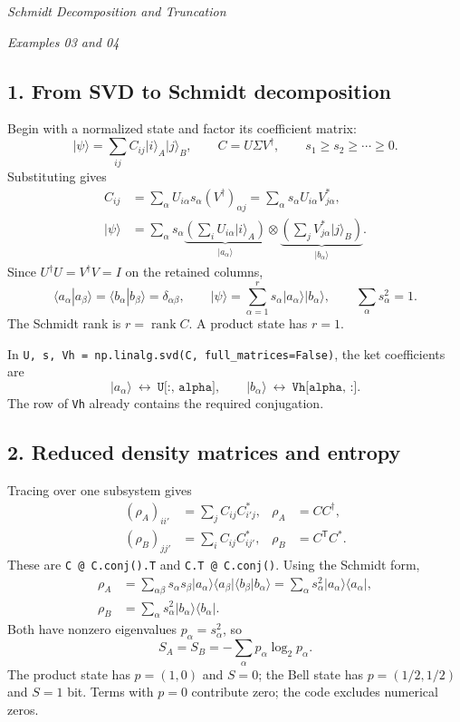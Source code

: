 \documentclass[11pt]{article}
\newcommand{\ket}[1]{\lvert #1\rangle}
\newcommand{\bra}[1]{\langle #1\rvert}
\newcommand{\heading}[1]{\begin{center}\large\textit{#1}\end{center}}
\begin{document}
\heading{Schmidt Decomposition and Truncation}
\textit{Examples 03 and 04}

\subsection*{1. From SVD to Schmidt decomposition}
Begin with a normalized state and factor its coefficient matrix:
\begin{equation}
\ket{\psi}=\sum_{ij}C_{ij}\ket{i}_A\ket{j}_B,
\qquad C=U\Sigma V^\dagger,\qquad s_1\geq s_2\geq\cdots\geq0.
\end{equation}
Substituting gives
\begin{align}
C_{ij}&=\sum_\alpha U_{i\alpha}s_\alpha(V^\dagger)_{\alpha j}
=\sum_\alpha s_\alpha U_{i\alpha}V_{j\alpha}^*,\\
\ket{\psi}&=\sum_\alpha s_\alpha
\underbrace{\left(\sum_i U_{i\alpha}\ket{i}_A\right)}_{\ket{a_\alpha}}
\otimes\underbrace{\left(\sum_j V_{j\alpha}^*\ket{j}_B\right)}_{\ket{b_\alpha}}.
\end{align}
Since $U^\dagger U=V^\dagger V=I$ on the retained columns,
\begin{equation}
\langle a_\alpha|a_\beta\rangle
=\langle b_\alpha|b_\beta\rangle=\delta_{\alpha\beta},
\qquad \ket{\psi}=\sum_{\alpha=1}^r s_\alpha\ket{a_\alpha}\ket{b_\alpha},
\qquad\sum_\alpha s_\alpha^2=1.
\end{equation}
The Schmidt rank is $r=\operatorname{rank}C$. A product state has $r=1$.

In \texttt{U, s, Vh = np.linalg.svd(C, full\_matrices=False)}, the ket coefficients are
\begin{equation}
\ket{a_\alpha}\ \longleftrightarrow\ \texttt{U[:, alpha]},
\qquad \ket{b_\alpha}\ \longleftrightarrow\ \texttt{Vh[alpha, :]}.
\end{equation}
The row of \texttt{Vh} already contains the required conjugation.

\subsection*{2. Reduced density matrices and entropy}
Tracing over one subsystem gives
\begin{align}
(\rho_A)_{ii'}&=\sum_j C_{ij}C^*_{i'j},&\rho_A&=CC^\dagger,\\
(\rho_B)_{jj'}&=\sum_i C_{ij}C^*_{ij'},&\rho_B&=C^{\mathsf T}C^*.
\end{align}
These are \texttt{C @ C.conj().T} and \texttt{C.T @ C.conj()}. Using the Schmidt form,
\begin{align}
\rho_A&=\sum_{\alpha\beta}s_\alpha s_\beta\ket{a_\alpha}\bra{a_\beta}
\langle b_\beta|b_\alpha\rangle
=\sum_\alpha s_\alpha^2\ket{a_\alpha}\bra{a_\alpha},\\
\rho_B&=\sum_\alpha s_\alpha^2\ket{b_\alpha}\bra{b_\alpha}.
\end{align}
Both have nonzero eigenvalues $p_\alpha=s_\alpha^2$, so
\begin{equation}
S_A=S_B=-\sum_\alpha p_\alpha\log_2p_\alpha.
\end{equation}
The product state has $p=(1,0)$ and $S=0$; the Bell state has $p=(1/2,1/2)$ and $S=1$ bit. Terms with $p=0$ contribute zero; the code excludes numerical zeros.
\end{document}
